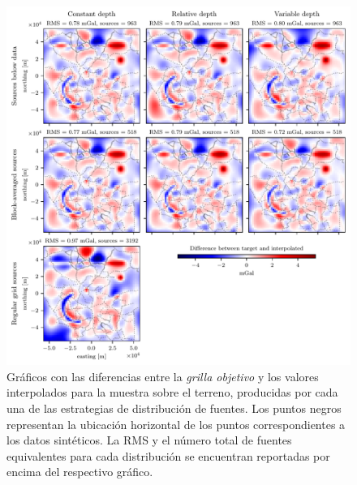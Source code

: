 \begin{figure}[p]
    \includegraphics[width=\linewidth]{figs/eql-gradient-boosted/ground_survey_differences.pdf}
    \caption{
        Gráficos con las diferencias entre la \emph{grilla objetivo} y los
        valores interpolados para la muestra sobre el terreno, producidas por
        cada una de las estrategias de distribución de fuentes.
        Los puntos negros representan la ubicación horizontal de los puntos
        correspondientes a los datos sintéticos.
        La \acs{RMS} y el número total de fuentes equivalentes para cada
        distribución se encuentran reportadas por encima del respectivo
        gráfico.
    }
    \label{fig:ground-survey-differences}
\end{figure}

